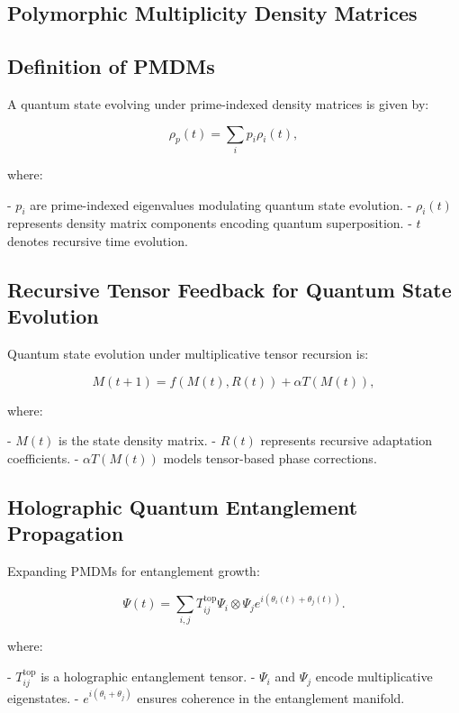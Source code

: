 \documentclass{article}
\theoremstyle{plain}
\begin{document}
\begin{itemize}
\begin{itemize}
\section{Polymorphic Multiplicity Density Matrices}

\subsection{Definition of PMDMs}
A quantum state evolving under prime-indexed density matrices is given by:

\begin{equation}
\rho_p (t) = \sum_{i} p_i \rho_i (t),
\end{equation}

where:

- \( p_i \) are prime-indexed eigenvalues modulating quantum state evolution.
- \( \rho_i (t) \) represents density matrix components encoding quantum superposition.
- \( t \) denotes recursive time evolution.

\subsection{Recursive Tensor Feedback for Quantum State Evolution}
Quantum state evolution under multiplicative tensor recursion is:

\begin{equation}
M(t+1) = f(M(t), R(t)) + \alpha T (M(t)),
\end{equation}

where:

- \( M(t) \) is the state density matrix.
- \( R(t) \) represents recursive adaptation coefficients.
- \( \alpha T(M(t)) \) models tensor-based phase corrections.

\subsection{Holographic Quantum Entanglement Propagation}
Expanding PMDMs for entanglement growth:

\begin{equation}
\Psi(t) = \sum_{i,j} T^{\text{top}}_{ij} \Psi_i \otimes \Psi_j e^{i(\theta_i(t) + \theta_j(t))}.
\end{equation}

where:

- \( T^{\text{top}}_{ij} \) is a holographic entanglement tensor.
- \( \Psi_i \) and \( \Psi_j \) encode multiplicative eigenstates.
- \( e^{i(\theta_i + \theta_j)} \) ensures coherence in the entanglement manifold.


\end{itemize}
\end{itemize}
\end{document}
